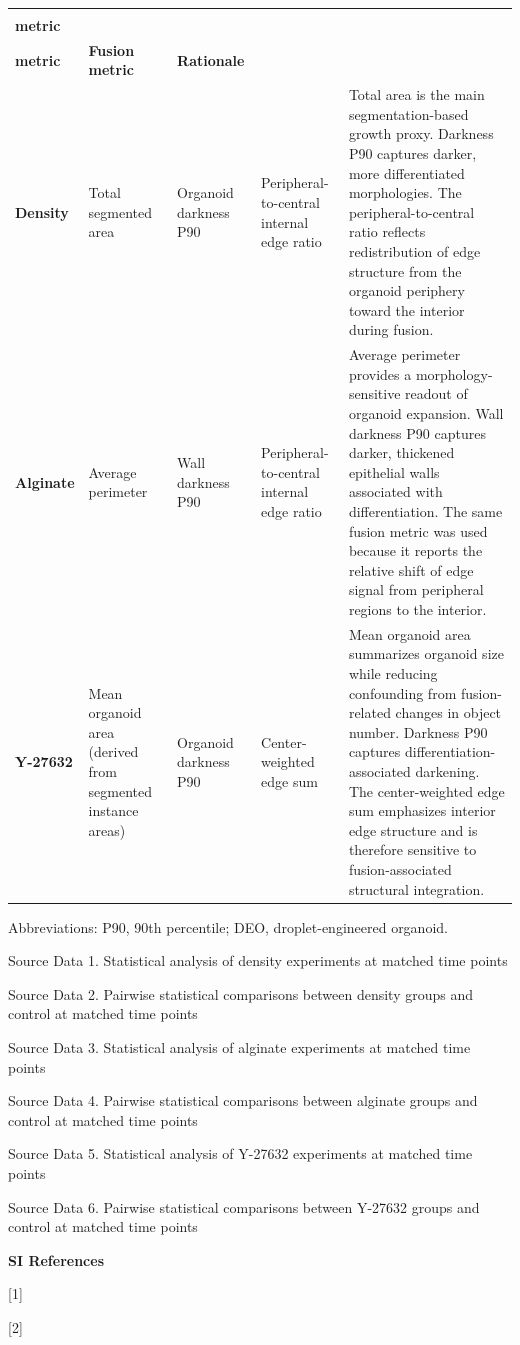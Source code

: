 \documentclass[
]{article}
\begin{document}
\begingroup
\scriptsize
\setlength{\tabcolsep}{1pt}
\begin{longtable}[]{@{}>{\raggedright\arraybackslash}p{0.50in}>{\raggedright\arraybackslash}p{0.65in}>{\raggedright\arraybackslash}p{0.72in}>{\raggedright\arraybackslash}p{0.82in}>{\raggedright\arraybackslash}p{1.55in}@{}}
\toprule
& \shortstack{\textbf{Growth}\\\textbf{metric}} & \shortstack{\textbf{Differentiation}\\\textbf{metric}} & \textbf{Fusion metric} & \textbf{Rationale} \\
\midrule
\endhead
\textbf{Density} & Total segmented area & Organoid darkness P90 & Peripheral-to-central internal edge ratio & Total area is the main segmentation-based growth proxy. Darkness P90 captures darker, more differentiated morphologies. The peripheral-to-central ratio reflects redistribution of edge structure from the organoid periphery toward the interior during fusion. \\
\textbf{Alginate} & Average perimeter & Wall darkness P90 & Peripheral-to-central internal edge ratio & Average perimeter provides a morphology-sensitive readout of organoid expansion. Wall darkness P90 captures darker, thickened epithelial walls associated with differentiation. The same fusion metric was used because it reports the relative shift of edge signal from peripheral regions to the interior. \\
\textbf{Y-27632} & Mean organoid area (derived from segmented instance areas) & Organoid darkness P90 & Center-weighted edge sum & Mean organoid area summarizes organoid size while reducing confounding from fusion-related changes in object number. Darkness P90 captures differentiation-associated darkening. The center-weighted edge sum emphasizes interior edge structure and is therefore sensitive to fusion-associated structural integration. \\
\bottomrule
\end{longtable}
\endgroup

Abbreviations: P90, 90th percentile; DEO, droplet-engineered organoid.

Source Data 1. Statistical analysis of density experiments at matched time points

Source Data 2. Pairwise statistical comparisons between density groups and control at matched time points

Source Data 3. Statistical analysis of alginate experiments at matched time points

Source Data 4. Pairwise statistical comparisons between alginate groups and control at matched time points

Source Data 5. Statistical analysis of Y-27632 experiments at matched time points

Source Data 6. Pairwise statistical comparisons between Y-27632 groups and control at matched time points

\textbf{SI References}

{[}1{]}

{[}2{]}
\end{document}
